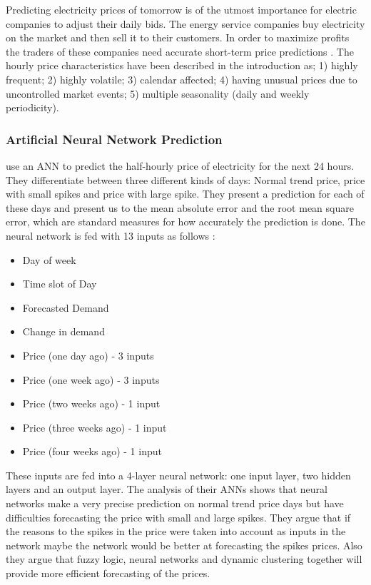 Predicting electricity prices of tomorrow is of the utmost importance for electric companies to adjust their daily bids. The energy service companies buy electricity on the market and then sell it to their customers. In order to maximize profits the traders of these companies need accurate short-term price predictions \cite{EnergyPriceForecasting}. The hourly price characteristics have been described in the introduction as; 1) highly frequent; 2) highly volatile; 3) calendar affected; 4) having unusual prices due to uncontrolled market events; 5) multiple seasonality (daily and weekly periodicity).

\subsubsection{Artificial Neural Network Prediction}\label{sec:scatterPaper}
\cite{singhal2011electricity} use an ANN to predict the half-hourly price of electricity for the next 24 hours. They differentiate between three different kinds of days: Normal trend price, price with small spikes and price with large spike. They present a prediction for each of these days and present us to the mean absolute error and the root mean square error, which are standard measures for how accurately the prediction is done. The neural network is fed with 13 inputs as follows \cite{singhal2011electricity}:
\begin{itemize}[noitemsep,topsep=3pt,parsep=2pt,partopsep=3pt]
\item Day of week
\item Time slot of Day
\item Forecasted Demand
\item Change in demand
\item Price (one day ago) - 3 inputs 
\item Price (one week ago) - 3 inputs
\item Price (two weeks ago) - 1 input 
\item Price (three weeks ago) - 1 input 
\item Price (four weeks ago) - 1 input
\end{itemize}
These inputs are fed into a 4-layer neural network: one input layer, two hidden layers and an output layer. The analysis of their ANNs shows that neural networks make a very precise prediction on normal trend price days but have difficulties forecasting the price with small and large spikes. They argue that if the reasons to the spikes in the price were taken into account as inputs in the network maybe the network would be better at forecasting the spikes prices. Also they argue that fuzzy logic, neural networks and dynamic clustering together will provide more efficient forecasting of the prices.
